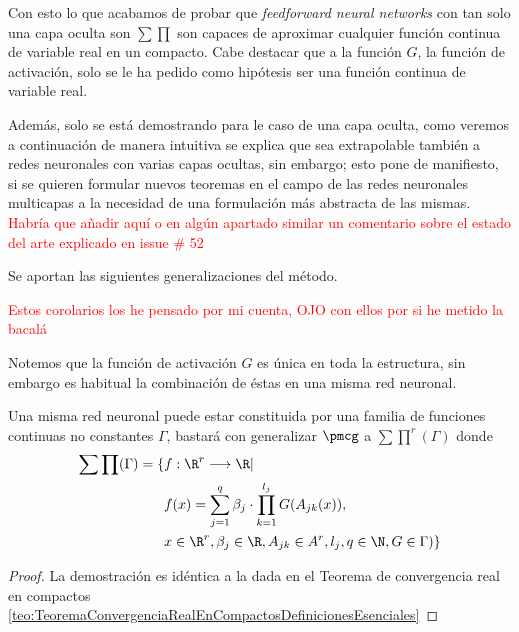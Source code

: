 Con esto lo que acabamos de probar que \textit{feedforward neural networks} con tan solo una capa oculta son $\sum \prod$ son capaces de aproximar cualquier 
función continua de variable real en un compacto.  Cabe destacar que a la función $G$, la función de activación,
 solo se le ha pedido como 
hipótesis ser una función continua de variable real.     

Además, solo se está demostrando para le caso de una capa oculta, como veremos a continuación  de 
manera intuitiva se explica que sea extrapolable también a redes neuronales 
con varias capas ocultas, sin embargo; esto pone de manifiesto, si se quieren formular nuevos teoremas en el campo de las redes neuronales
multicapas a la necesidad de una formulación más abstracta de las mismas. 
\textcolor{red}{Habría que añadir aquí o en algún apartado similar un comentario
sobre el estado del arte explicado en issue \# 52 }

Se aportan las siguientes generalizaciones del método. 

\textcolor{red}{Estos corolarios los he pensado por mi cuenta, OJO con ellos por si he metido la bacalá}

Notemos que la función de activación $G$ es única en toda la estructura,
sin embargo es habitual la combinación de éstas en una misma red neuronal. 

\begin{corolario}

    Una misma red neuronal puede estar constituida por una familia de funciones continuas no constantes $\Gamma$, 
    bastará con generalizar $\pmcg$ a $\sum \prod ^r (\Gamma)$ donde 
    \begin{equation}
        \begin{split}
            \sum \prod (\Gamma) = \{ 
                &f: \R^r \longrightarrow \R | \\
                & f(x) = \sum_{j = 1} ^q  \beta_j \cdot \prod_{k=1}^{l_j}
                G(A_{jk}(x)), \\
                &x  \in \R^r, \beta_j \in \R, A_{jk}\in A^r, l_j,q \in \N, G \in \Gamma
                )
                \}
        \end{split}
    \end{equation}
\end{corolario}
\begin{proof}
    La demostración es idéntica a la dada en el Teorema de convergencia 
    real en compactos \ref{teo:TeoremaConvergenciaRealEnCompactosDefinicionesEsenciales}
\end{proof}

